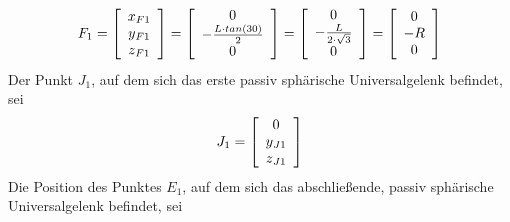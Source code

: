 \documentclass[Bachelor, BMR, ngerman]{twbook}
\begin{document}
    \begin{align}
        F_1 = 
            \left[
                \begin{array}{c} 
                    x\textsubscript{$F1$}\\
                    y\textsubscript{$F1$}\\
                    z\textsubscript{$F1$} 
                \end{array}
            \right] =
            \left[
                \begin{array}{c} 
                    0\\
                    - \frac{L \cdot tan(30)}{2}\\
                    0 
                \end{array}
            \right] =
            \left[
                \begin{array}{c} 
                    0\\
                    - \frac{L}{2 \cdot \sqrt{3}}\\
                    0 
                \end{array}
            \right] =
            \left[
                \begin{array}{c} 
                    0\\
                    - R\\
                    0 
                \end{array}
            \right]
        \label{eq:F1}
    \end{align}
    \noindent
    Der Punkt $J_1$, auf dem sich das erste passiv sphärische Universalgelenk befindet, sei
    \newline
    \begin{align}
        J_1 = 
            \left[
                \begin{array}{c} 
                    0\\
                    y\textsubscript{$J1$}\\
                    z\textsubscript{$J1$} 
                \end{array}
            \right]
        \label{eq:J1}
    \end{align}
    \noindent
    Die Position des Punktes $E_1$, auf dem sich das abschließende, passiv sphärische Universalgelenk befindet, sei
    \newline
\end{document}
